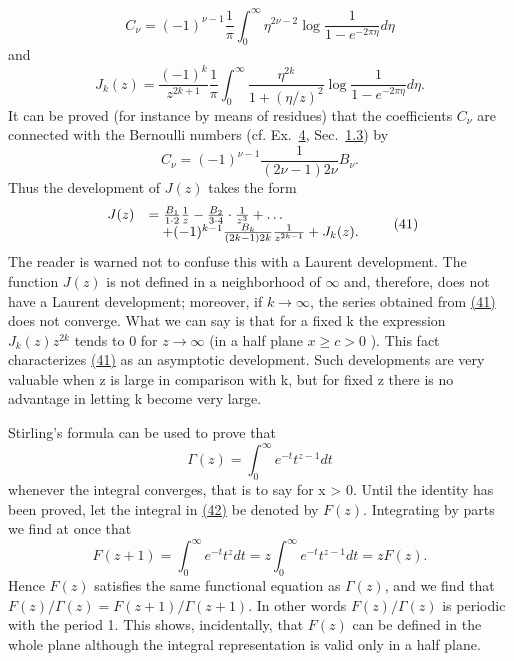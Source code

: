 \begin{equation*}
C _ {\nu} = (- 1) ^ {\nu - 1} \frac {1}{\pi} \int_ {0} ^ {\infty} \eta^ {2 \nu - 2} \log \frac {1}{1 - e ^ {- 2 \pi \eta}} d \eta\tag{39}\label{eq:5.39}
\end{equation*}
and
\begin{equation*}
J _ {k} (z) = \frac {(- 1) ^ {k}}{z ^ {2 k + 1}} \frac {1}{\pi} \int_ {0} ^ {\infty} \frac {\eta^ {2 k}}{1 + (\eta / z) ^ {2}} \log \frac {1}{1 - e ^ {- 2 \pi \eta}} d \eta .
\end{equation*}
It can be proved (for instance by means of residues) that the coefficients $C_{\nu}$ are connected with the Bernoulli numbers (cf. Ex.~\hyperref[exercise:5.1.3.3.4]{4}, Sec.~\hyperref[sec:5.1.3]{1.3}) by
\begin{equation*}
C _ {\nu} = (- 1) ^ {\nu - 1} \frac {1}{(2 \nu - 1) 2 \nu} B _ {\nu}.\tag{40}\label{eq:5.40}
\end{equation*}
Thus the development of $J(z)$ takes the form
\begin{equation*}
\begin{array}{r l} J (z) & = \frac {B _ {1}}{1 \cdot 2} \frac {1}{z} - \frac {B _ {2}}{3 \cdot 4} \cdot \frac {1}{z ^ {3}} + \dots \\ & \quad + (- 1) ^ {k - 1} \frac {B _ {k}}{(2 k - 1) 2 k} \frac {1}{z ^ {2 k - 1}} + J _ {k} (z). \end{array}\tag{41}\label{eq:5.41}
\end{equation*}
The reader is warned not to confuse this with a Laurent development. The function $J(z)$ is not defined in a neighborhood of $\infty$ and, therefore, does not have a Laurent development; moreover, if $k \to \infty$, the series obtained from \hyperref[eq:5.41]{(41)} does not converge. What we can say is that for a fixed k the expression $J_{k}(z)z^{2k}$ tends to 0 for $z \to \infty$ (in a half plane $x \geq c > 0$ ). This fact characterizes \hyperref[eq:5.41]{(41)} as an asymptotic development. Such developments are very valuable when z is large in comparison with k, but for fixed z there is no advantage in letting k become very large.

Stirling's formula can be used to prove that
\begin{equation*}
\Gamma (z) = \int_ {0} ^ {\infty} e ^ {- t} t ^ {z - 1} d t\tag{42}\label{eq:5.42}
\end{equation*}
whenever the integral converges, that is to say for x > 0. Until the identity has been proved, let the integral in \hyperref[eq:5.42]{(42)} be denoted by $F(z)$. Integrating by parts we find at once that
\begin{equation*}
F (z + 1) = \int_ {0} ^ {\infty} e ^ {- t} t ^ {z} d t = z \int_ {0} ^ {\infty} e ^ {- t} t ^ {z - 1} d t = z F (z).
\end{equation*}
Hence $F(z)$ satisfies the same functional equation as $\Gamma(z)$, and we find that $F(z)/\Gamma(z)=F(z+1)/\Gamma(z+1)$. In other words $F(z)/\Gamma(z)$ is periodic with the period 1. This shows, incidentally, that $F(z)$ can be defined in the whole plane although the integral representation is valid only in a half plane.

